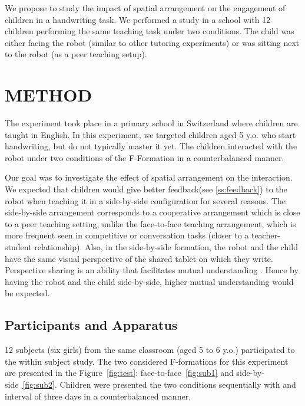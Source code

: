 \documentclass[letterpaper, 10 pt, conference]{ieeeconf}  %
\begin{document}
We propose to study the impact of spatial arrangement on the engagement of children in a handwriting task.
We performed a study in a school with 12 children performing the same teaching task under two conditions.
The child was either facing the robot (similar to other tutoring experiments) or was sitting next to the robot (as a peer teaching setup).


\section{METHOD}
The experiment took place in a primary school in Switzerland where children are taught in English.
In this experiment, we targeted children aged 5 y.o. who start handwriting, but do not typically master it yet.
The children interacted with the robot under two conditions of the F-Formation in a counterbalanced manner.

Our goal was to investigate the effect of spatial arrangement on the interaction.
We expected that children would give better feedback(see \ref{ss:feedback}) to the robot
when teaching it in a side-by-side configuration for several reasons.
The side-by-side arrangement corresponds to a cooperative arrangement which is close to a peer teaching setting, unlike the face-to-face teaching arrangement, which is more frequent seen in competitive or conversation tasks (closer to a teacher-student relationship).
Also, in the side-by-side formation, the robot and the child have the same visual perspective of the shared tablet on which they write.
Perspective sharing is an ability that facilitates mutual understanding \cite{berlin2006perspective}.
Hence by having the robot and the child side-by-side, higher mutual understanding would be expected.

\subsection{Participants and Apparatus}
12 subjects (six girls) from the same classroom (aged 5 to 6 y.o.) participated to the within subject study.
The two considered F-formations for this experiment are presented in the Figure~\ref{fig:test}: face-to-face~\ref{fig:sub1} and side-by-side~\ref{fig:sub2}.
Children were presented the two conditions sequentially with and interval of three days in a counterbalanced manner.
\end{document}
